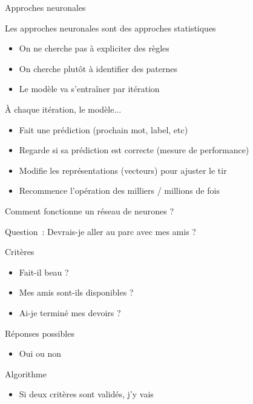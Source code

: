 \documentclass[serif, aspectratio=169]{beamer}
\begin{document}
\begin{frame}{Approches neuronales}
    \pause
    \begin{block}{Les approches neuronales sont des approches statistiques}
        \begin{itemize}
            \item On ne cherche pas à expliciter des règles
            \item On cherche plutôt à identifier des paternes
            \item Le modèle va s'entraîner par itération
        \end{itemize}
    \end{block}
    \vfill
    \pause
    \begin{block}{À chaque itération, le modèle...}
        \begin{itemize}
            \item Fait une prédiction (prochain mot, label, etc)
            \item Regarde si sa prédiction est correcte (mesure de performance)
            \item Modifie les représentations (vecteurs) pour ajuster le tir
            \item Recommence l'opération des milliers / millions de fois
        \end{itemize}
    \end{block}
\end{frame}

\begin{frame}{Comment fonctionne un réseau de neurones ?}
    \begin{center}
        \Large
        Question~: Devrais-je aller au parc avec mes amis ?
    \end{center}
    \vfill
    \begin{block}{Critères}
        \begin{itemize}
            \item Fait-il beau ? 
            \item Mes amis sont-ils disponibles ?
            \item Ai-je terminé mes devoirs ?
        \end{itemize}
    \end{block}
    \vfill
    \begin{block}{Réponses possibles}
        \begin{itemize}
            \item Oui ou non
        \end{itemize}
    \end{block}
    \vfill
    \begin{block}{Algorithme}
        \begin{itemize}
            \item Si deux critères sont validés, j'y vais
        \end{itemize}
    \end{block}
\end{frame}
\end{document}

